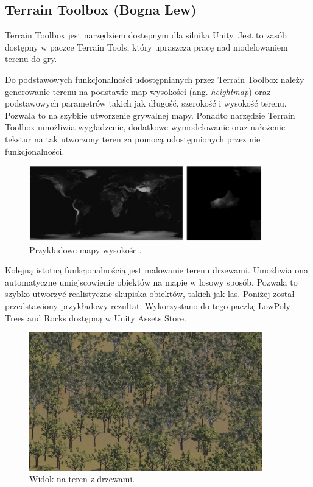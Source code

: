 \subsection{Terrain Toolbox (Bogna Lew)}\label{ss:tTool}
Terrain Toolbox jest narzędziem dostępnym dla silnika Unity. Jest to zasób dostępny w paczce Terrain Tools, który
upraszcza pracę nad modelowaniem terenu do gry.

Do podstawowych funkcjonalności udostępnianych przez Terrain Toolbox należy generowanie terenu na podstawie
map wysokości (ang. \textit{heightmap}) oraz podstawowych parametrów takich jak długość, szerokość i wysokość terenu.
Pozwala to na szybkie utworzenie grywalnej mapy. Ponadto narzędzie Terrain Toolbox umożliwia wygładzenie, dodatkowe
wymodelowanie oraz nałożenie tekstur na tak utworzony teren za pomocą udostępnionych przez nie funkcjonalności.

\begin{figure}[h!]
    \centering
    \includegraphics[width=0.9\textwidth]{images/modelowanie_terenu/przykladowe_heightmapy.jpg}
    \caption{Przykładowe mapy wysokości.}
\end{figure}

Kolejną istotną funkcjonalnością jest malowanie terenu drzewami. Umożliwia ona automatyczne umiejscowienie obiektów na
mapie w losowy sposób. Pozwala to szybko utworzyć realistyczne skupiska obiektów, takich jak las. Poniżej
został przedstawiony przykładowy rezultat. Wykorzystano do tego paczkę LowPoly Trees and Rocks dostępną w Unity
Assets Store.

\begin{figure}[h!]
    \centering
    \includegraphics[width=0.9\textwidth]{images/modelowanie_terenu/drzewa.jpg}
    \caption{Widok na teren z drzewami.}
\end{figure}
